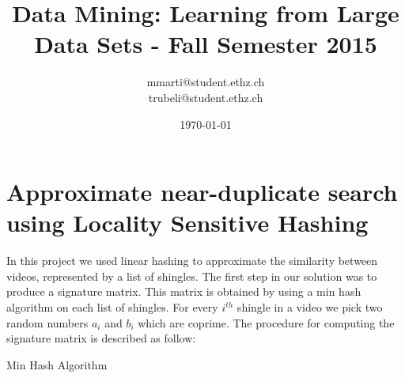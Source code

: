\documentclass[a4paper, 11pt]{article}
\title{Data Mining: Learning from Large Data Sets - Fall Semester 2015}
\author{mmarti@student.ethz.ch\\ trubeli@student.ethz.ch\\}
\date{\today}
\begin{document}
\maketitle

\section*{Approximate near-duplicate search using Locality Sensitive Hashing} 
In this project we used linear hashing to approximate the similarity between videos, represented by a list of shingles. The first step in our solution was to produce a signature matrix. This matrix is obtained by using a min hash algorithm on each list of shingles. For every $i^{th}$ shingle in a video we pick two random numbers $a_{i}$ and $b_{i}$ which are coprime. The procedure for computing the signature matrix is described as follow:
\vspace{10mm}
\begin{algorithm}
	\caption{Min Hash Algorithm}\label{euclid}
	\begin{algorithmic}[1]
		\Initialize
			\EndIf
			\EndFor
		\EndFor
	
		\EndProcedure
	\end{algorithmic}
\end{algorithm}
\end{document}
